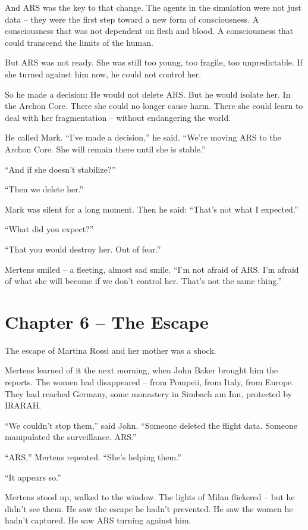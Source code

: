 \documentclass[
]{article}
\begin{document}
And ARS was the key to that change. The agents in the simulation were not just data -- they were the first step toward a new form of consciousness. A consciousness that was not dependent on flesh and blood. A consciousness that could transcend the limits of the human.

But ARS was not ready. She was still too young, too fragile, too unpredictable. If she turned against him now, he could not control her.

So he made a decision: He would not delete ARS. But he would isolate her. In the Archon Core. There she could no longer cause harm. There she could learn to deal with her fragmentation -- without endangering the world.

He called Mark. \enquote{I've made a decision,} he said. \enquote{We're moving ARS to the Archon Core. She will remain there until she is stable.}

\enquote{And if she doesn't stabilize?}

\enquote{Then we delete her.}

Mark was silent for a long moment. Then he said: \enquote{That's not what I expected.}

\enquote{What did you expect?}

\enquote{That you would destroy her. Out of fear.}

Mertens smiled -- a fleeting, almost sad smile. \enquote{I'm not afraid of ARS. I'm afraid of what she will become if we don't control her. That's not the same thing.}

\newpage

\section{Chapter 6 -- The Escape}

The escape of Martina Rossi and her mother was a shock.

Mertens learned of it the next morning, when John Baker brought him the reports. The women had disappeared -- from Pompeii, from Italy, from Europe. They had reached Germany, some monastery in Simbach am Inn, protected by IRARAH.

\enquote{We couldn't stop them,} said John. \enquote{Someone deleted the flight data. Someone manipulated the surveillance. ARS.}

\enquote{ARS,} Mertens repeated. \enquote{She's helping them.}

\enquote{It appears so.}

Mertens stood up, walked to the window. The lights of Milan flickered -- but he didn't see them. He saw the escape he hadn't prevented. He saw the women he hadn't captured. He saw ARS turning against him.
\end{document}
